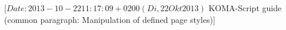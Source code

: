 %
%
%
%
%
%
%
%
% 
%
%
%
%

                 [$Date: 2013-10-22 11:17:09 +0200 (Di, 22 Okt 2013) $
                  KOMA-Script guide (common paragraph: 
                                     Manipulation of defined page styles)]


\makeatletter
{}%
%
%
\makeatother

